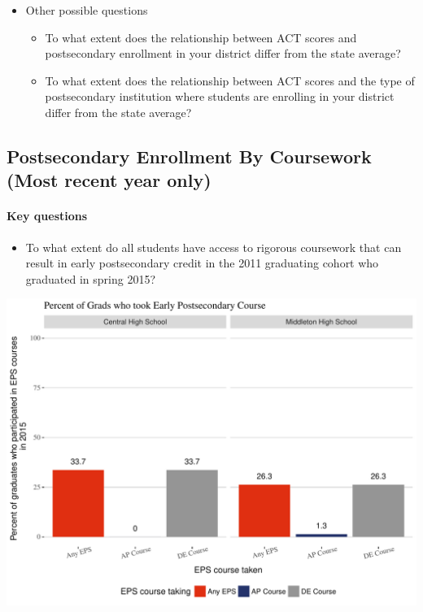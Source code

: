 \documentclass[11pt,]{article}
\providecommand{\tightlist}{%
  \setlength{\itemsep}{0pt}\setlength{\parskip}{0pt}}
\let\oldparagraph\paragraph
\renewcommand{\paragraph}[1]{\oldparagraph{#1}\mbox{}}
\begin{document}
\begin{itemize}
\tightlist
\item
  Other possible questions

  \begin{itemize}
  \tightlist
  \item
    To what extent does the relationship between ACT scores and
    postsecondary enrollment in your district differ from the state
    average?
  \item
    To what extent does the relationship between ACT scores and the type
    of postsecondary institution where students are enrolling in your
    district differ from the state average?
  \end{itemize}
\end{itemize}

\newpage

\subsection{Postsecondary Enrollment By Coursework (Most recent year
only)}\label{postsecondary-enrollment-by-coursework-most-recent-year-only}

\paragraph{Key questions}\label{key-questions-4}

\begin{itemize}
\tightlist
\item
  To what extent do all students have access to rigorous coursework that
  can result in early postsecondary credit in the 2011 graduating cohort
  who graduated in spring 2015?
\end{itemize}

\includegraphics{20170411_PSWRR_no_CTE_files/figure-latex/Figure9a-1.pdf}
\end{document}
